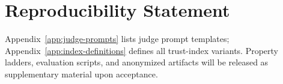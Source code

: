 \documentclass{article}
\begin{document}
\section*{Reproducibility Statement}
Appendix~\ref{app:judge-prompts} lists judge prompt templates; Appendix~\ref{app:index-definitions} defines all trust-index variants. Property ladders, evaluation scripts, and anonymized artifacts will be released as supplementary material upon acceptance.










\end{document}
